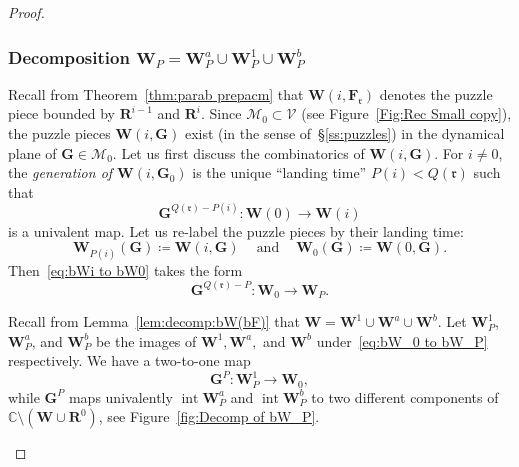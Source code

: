 \documentclass{amsart}
\renewcommand{\sp}{{\ \ }}
\newcommand{\1}{{\mathbb 1 }}
\newcommand\MM{\mathscr{M}}
\newcommand\bMM{{\pmb {\MM}}}
\newcommand\intr{\operatorname{int}}
\newcommand{\bF}{{\mathbf F}}
\newcommand{\bW}{{\mathbf W}}
\newcommand{\bR}{{\mathbf R}}
\newcommand{\bG}{{\mathbf G}}
\newcommand{\rr}{\mathfrak{r}}
\newcommand\bVV{{ \boldsymbol{\mathcal V}}}
\newcommand{\C}{\mathbb{C}}
\theoremstyle{remark}
\numberwithin{equation}{section}
\theoremstyle{definition}
\theoremstyle{nonumberbreak}
\begin{document}
\begin{proof}
\subsubsection{Decomposition $\bW_P=\bW^a_P\cup \bW_P^1\cup \bW^b_P$} 
\label{sss:Decomp bW_P}
Recall from Theorem~\ref{thm:parab prepacm} that $\bW(i,\bF_\rr)$ denotes the puzzle piece bounded by $\bR^{i-1}$ and $\bR^i$. Since $\bMM_0\subset \bVV$ (see Figure~\ref{Fig:Rec Small copy}), the puzzle pieces $\bW(i, \bG)$ exist (in the sense of~\S\ref{ss:puzzles}) in the dynamical plane of $\bG\in \bMM_0$. Let us first discuss the combinatorics of $\bW(i,\bG)$. For $i\not= 0$, the \emph{generation of $\bW(i,\bG_0)$} is the unique ``landing time'' $P(i)<Q(\rr)$ such that 
\begin{equation}
\label{eq:bWi to bW0}
\bG^{Q(\rr)-P(i)}\colon \bW(0)\to \bW(i)
\end{equation}
 is a univalent map.  Let us re-label the puzzle pieces by their landing time:
   \[\bW_{P(i)}(\bG)\coloneqq \bW(i,\bG)\sp\sp \text{ and }\sp\sp \bW_0(\bG)\coloneqq \bW(0,\bG).\]
Then~\eqref{eq:bWi to bW0} takes the form 
\begin{equation}
\label{eq:bW_0 to bW_P}
\bG^{Q(\rr)-P}\colon \bW_0\to \bW_P.
\end{equation}

Recall from Lemma~\ref{lem:decomp:bW(bF)}  that $\bW=\bW^1\cup \bW^a \cup \bW^b$.  Let $\bW^1_P$, $\bW^a_P$, and $\bW^b_P$ be the images of $\bW^1, \bW^a ,$ and $\bW^b$  under~\eqref{eq:bW_0 to bW_P} respectively. We have a two-to-one map 
\begin{equation}
\label{eq:bW_P to bW_0}
\bG^P\colon \bW^1_P\to \bW_0,
\end{equation}
 while $\bG^P$ maps univalently $\intr \bW^a_P$ and $\intr \bW^b_P$ to two different components of $\C\setminus (\bW\cup \bR^{0})$, see Figure~\ref{fig:Decomp of bW_P}.
 









\begin{figure}
\end{figure}
\end{proof}
\end{document}
